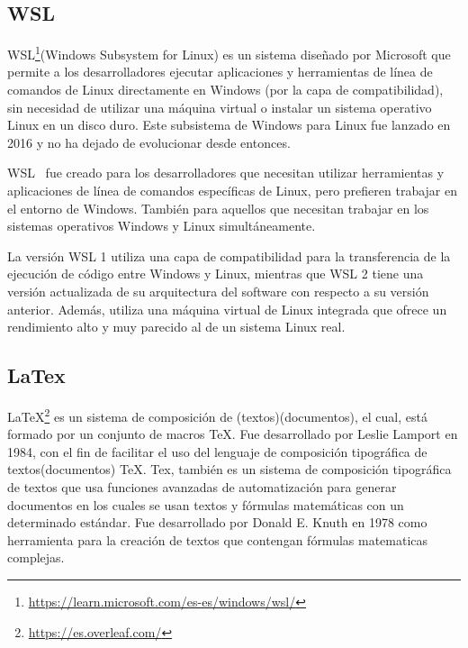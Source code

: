 \documentclass[a4paper, 12pt]{book}
\begin{document}
\subsection{WSL} %
\label{sec:wsl} %

WSL\footnote{\url{https://learn.microsoft.com/es-es/windows/wsl/}}(Windows Subsystem for Linux) es un sistema diseñado por Microsoft que permite a los desarrolladores ejecutar aplicaciones y herramientas de línea de comandos de Linux directamente en Windows (por la capa de compatibilidad), sin necesidad de utilizar una máquina virtual o instalar un sistema operativo Linux en un disco duro. 
Este subsistema de Windows para Linux fue lanzado en 2016 y no ha dejado de evolucionar desde entonces. 


WSL~\cite{medriforensic} fue creado para los desarrolladores que necesitan utilizar herramientas y aplicaciones de línea de comandos específicas de Linux, pero prefieren trabajar en el entorno de Windows. 
También para aquellos que necesitan trabajar en los sistemas operativos Windows y Linux simultáneamente.


La versión WSL 1 utiliza una capa de compatibilidad para la transferencia de la ejecución de código entre Windows y Linux,
mientras que WSL 2 tiene una versión actualizada de su arquitectura del software con respecto a su versión anterior. 
Además, utiliza una máquina virtual de Linux integrada que ofrece un rendimiento alto y muy parecido al de un sistema Linux real.


\subsection{LaTex} %
\label{sec:latex} %

LaTeX\footnote{\url{https://es.overleaf.com/}} es un sistema de composición de (textos)(documentos), el cual, está formado por un conjunto de macros TeX. 
Fue desarrollado por Leslie Lamport en 1984, con el fin de facilitar el uso del lenguaje de composición tipográfica de textos(documentos) TeX.
Tex, también es un sistema de composición tipográfica de textos que usa funciones avanzadas de automatización para generar documentos en los cuales se usan textos y fórmulas matemáticas con un determinado estándar.
Fue desarrollado por Donald E. Knuth en 1978 como herramienta para la creación de textos que contengan fórmulas matematicas complejas.
\end{document}
